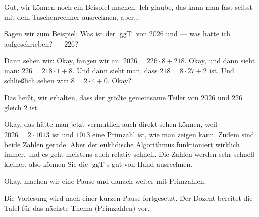 \begin{spoken-clean}[00:38:39 - 00:40:35]
Gut, wir können noch ein Beispiel machen. Ich glaube, das kann man fast selbst mit dem Taschenrechner ausrechnen, aber...

Sagen wir zum Beispiel: Was ist der $\operatorname{ggT}$ von $2026$ und --- was hatte ich aufgeschrieben? --- $226$?

Dann sehen wir: Okay, fangen wir an. $2026 = 226 \cdot 8 + 218$. Okay, und dann sieht man: $226 = 218 \cdot 1 + 8$. Und dann sieht man, dass $218 = 8 \cdot 27 + 2$ ist. Und schließlich sehen wir: $8 = 2 \cdot 4 + 0$. Okay?

Das heißt, wir erhalten, dass der größte gemeinsame Teiler von $2026$ und $226$ gleich $2$ ist.

Okay, das hätte man jetzt vermutlich auch direkt sehen können, weil $2026 = 2 \cdot 1013$ ist und $1013$ eine Primzahl ist, wie man zeigen kann. Zudem sind beide Zahlen gerade. Aber der euklidische Algorithmus funktioniert wirklich immer, und es geht meistens auch relativ schnell. Die Zahlen werden sehr schnell kleiner, also können Sie die $\operatorname{ggT}$s gut von Hand ausrechnen.
\end{spoken-clean}

\begin{math-stroke}
\end{math-stroke}

\begin{spoken-clean}[00:40:35 - 00:40:39]
Okay, machen wir eine Pause und danach weiter mit Primzahlen.
\end{spoken-clean}

\begin{lecture-break}
Die Vorlesung wird nach einer kurzen Pause fortgesetzt. Der Dozent bereitet die Tafel für das nächste Thema (Primzahlen) vor.
\end{lecture-break}

